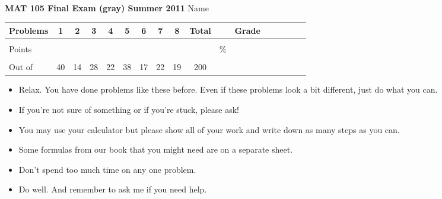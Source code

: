 \documentclass[12pt]{article}
\begin{document}
{\bf MAT 105 Final Exam (gray) Summer 2011} \hspace{.4in} {\large Name} \hrulefill

\hspace{.2in}

\begin{center}

\begin{tabular}
{|l|c|c|c|c|c|c|c|c|c|c|c|c|c|c|c|c|} \hline

 Problems & \hspace{5 pt} 1 \hspace{5 pt}  & \hspace{5 pt} 2 \hspace{5 pt} & \hspace{5 pt} 3 \hspace{5 pt} & \hspace{5 pt} 4 \hspace{5 pt}& \hspace{5 pt} 5 \hspace{5 pt} & \hspace{5 pt} 6 \hspace{5 pt} & \hspace{5 pt} 7 \hspace{5 pt}   & \hspace{5 pt} 8 \hspace{5 pt} &  \hspace{5 pt} Total  \hspace{5 pt} & &  \hspace{5 pt} Grade \hspace{5 pt}  \\ \hline
&&&&&&&&&&&\\  
Points &&&&&&&&&&   \hspace{.6in}\% &  \\ 
&&&&&&&&&&& \\  \hline
Out of & 40  & 14 & 28 & 22 & 38 & 17 & 22 & 19 &200 & & \\ \hline

\end {tabular}
 
\end{center}

\hspace{.2in}

\begin{itemize}
\item Relax.  You have done problems like these before. Even if these problems look a bit different, just do what you can. 
\item  If you're not sure of something or if you're stuck, please ask! 
\item You may use your calculator but please show all of your work and write down as many steps as you can.  
\item Some formulas from our book that you might need are on a separate sheet.
\item Don't spend too much time on any one problem.
\item  Do well.  And remember to ask me if you need help.
\end{itemize}
\end{document}
